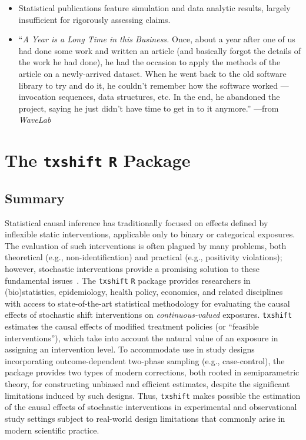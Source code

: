 \begin{itemize}
  \itemsep4pt
  \item Statistical publications feature simulation and data analytic results,
    largely insufficient for rigorously assessing claims.
  \item ``\textit{A Year is a Long Time in this Business.} Once, about a year
    after one of us had done some work and written an article (and basically
    forgot the details of the work he had done), he had the occasion to apply
    the methods of the article on a newly-arrived dataset. When he went back to
    the old software library to try and do it, he couldn't remember how the
    software worked --- invocation sequences, data structures, etc. In the end,
    he abandoned the project, saying he just didn't have time to get in to it
    anymore.'' ---from \textit{WaveLab}
\end{itemize}


\section{The \texttt{txshift} \texttt{R} Package}

\subsection{Summary}

Statistical causal inference has traditionally focused on effects defined by
inflexible static interventions, applicable only to binary or categorical
exposures. The evaluation of such interventions is often plagued by many
problems, both theoretical (e.g., non-identification) and practical (e.g.,
positivity violations); however, stochastic interventions provide a promising
solution to these fundamental issues~\citep{diaz2018stochastic}. The
\texttt{txshift} \texttt{R} package provides researchers in (bio)statistics,
epidemiology, health policy, economics, and related disciplines with access to
state-of-the-art statistical methodology for evaluating the causal effects of
stochastic shift interventions on \textit{continuous-valued} exposures.
\texttt{txshift} estimates the causal effects of modified treatment policies (or
``feasible interventions''), which take into account the natural value of an
exposure in assigning an intervention level. To accommodate use in study designs
incorporating outcome-dependent two-phase sampling (e.g., case-control), the
package provides two types of modern corrections, both rooted in semiparametric
theory, for constructing unbiased and efficient estimates, despite the
significant limitations induced by such designs. Thus, \texttt{txshift} makes
possible the estimation of the causal effects of stochastic interventions in
experimental and observational study settings subject to real-world design
limitations that commonly arise in modern scientific practice.

